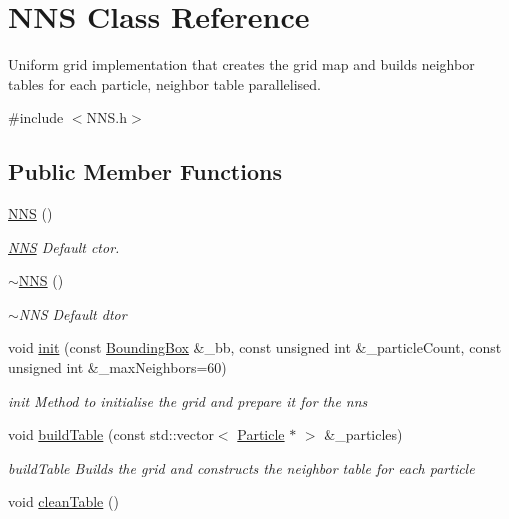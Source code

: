 \hypertarget{classNNS}{}\section{N\+NS Class Reference}
\label{classNNS}


Uniform grid implementation that creates the grid map and builds neighbor tables for each particle, neighbor table parallelised.  




{\ttfamily \#include $<$N\+N\+S.\+h$>$}

\subsection*{Public Member Functions}
\begin{DoxyCompactItemize}
\item 
\hyperlink{classNNS_abade6f586869c6bfdac7c05eeaf50d9c}{N\+NS} ()\hypertarget{classNNS_abade6f586869c6bfdac7c05eeaf50d9c}{}\label{classNNS_abade6f586869c6bfdac7c05eeaf50d9c}

\begin{DoxyCompactList}\small\item\em \hyperlink{classNNS}{N\+NS} Default ctor. \end{DoxyCompactList}\item 
\hyperlink{classNNS_a1d4eddea97d0ab3e7a2527b0c2bd39df}{$\sim$\+N\+NS} ()\hypertarget{classNNS_a1d4eddea97d0ab3e7a2527b0c2bd39df}{}\label{classNNS_a1d4eddea97d0ab3e7a2527b0c2bd39df}

\begin{DoxyCompactList}\small\item\em $\sim$\+N\+NS Default dtor \end{DoxyCompactList}\item 
void \hyperlink{classNNS_ad05c2587ca92a0d6d424383aca42a9b6}{init} (const \hyperlink{classBoundingBox}{Bounding\+Box} \&\+\_\+bb, const unsigned int \&\+\_\+particle\+Count, const unsigned int \&\+\_\+max\+Neighbors=60)
\begin{DoxyCompactList}\small\item\em init Method to initialise the grid and prepare it for the nns \end{DoxyCompactList}\item 
void \hyperlink{classNNS_a69702190a37743cb666da72c9828fb61}{build\+Table} (const std\+::vector$<$ \hyperlink{structParticle}{Particle} $\ast$ $>$ \&\+\_\+particles)
\begin{DoxyCompactList}\small\item\em build\+Table Builds the grid and constructs the neighbor table for each particle \end{DoxyCompactList}\item 
void \hyperlink{classNNS_af7b3f89428efe4016240c595ce66d500}{clean\+Table} ()\hypertarget{classNNS_af7b3f89428efe4016240c595ce66d500}{}\label{classNNS_af7b3f89428efe4016240c595ce66d500}


\end{DoxyCompactItemize}

